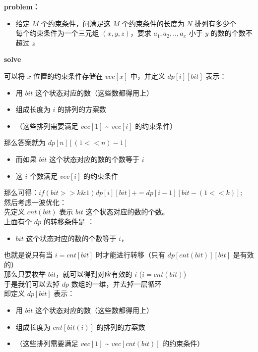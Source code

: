 \documentclass[E:/GsjzTle/main/main.tex]{subfiles}
\begin{document}
\textbf{problem：}

\begin{itemize}
\item
  给定 \(M\) 个约束条件，问满足这 \(M\) 个约束条件的长度为 \(N\)
  排列有多少个\\
  每个约束条件为一个三元组 \((x , y, z)\)，要求 \(a_1,a_2,..,a_x\) 小于
  \(y\) 的数的个数不超过 \(z\)
\end{itemize}

\textbf{solve}

可以将 \(x\) 位置的约束条件存储在 \(vec[x]\) 中，并定义 \(dp[i][bit]\)
表示：

\begin{itemize}
\item
  用 \(bit\) 这个状态对应的数（这些数都得用上）
\item
  组成长度为 \(i\) 的排列的方案数
\item
  （这些排列需要满足 \(vec[1]\) \textasciitilde{} \(vec[i]\)
  的约束条件）
\end{itemize}

那么答案就为 \(dp[n][(1 << n) - 1]\)

\begin{itemize}
\item
  而如果 \(bit\) 这个状态对应的数的个数等于 \(i\)
\item
  这 \(i\) 个数满足 \(vec[i]\) 的约束条件
\end{itemize}

那么可得：\(if(bit >> k \& 1) dp[i][bit] += dp[i - 1][bit - (1 << k)];\)\\
然后考虑一波优化：\\
先定义 \(cnt(bit)\) 表示 \(bit\) 这个状态对应的数的个数。\\
上面有个 \(dp\) 的转移条件是 ：

\begin{itemize}
\item
  \(bit\) 这个状态对应的数的个数等于 \(i\)，
\end{itemize}

也就是说只有当 \(i = cnt[bit]\) 时才能进行转移（只有
\(dp[cnt(bit)][bit]\) 是有效的）\\
那么只要枚举 \(bit\)，就可以得到对应有效的 \(i\) (\(i = cnt(bit)\))\\
于是我们可以去掉 \(dp\) 数组的一维，并去掉一层循环\\
即定义 \(dp[bit]\) 表示：

\begin{itemize}
\item
  用 \(bit\) 这个状态对应的数（这些数都得用上）
\item
  组成长度为 \(cnt[bit(i)]\) 的排列的方案数
\item
  （这些排列需要满足 \(vec[1]\) \textasciitilde{} \(vec[cnt(bit)]\)
  的约束条件）
\end{itemize}
\end{document}
